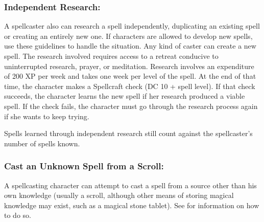 \subsubsection{Independent Research:} 
A spellcaster also can research a spell independently, duplicating an existing spell or creating an entirely new one. 
If characters are allowed to develop new spells, use these guidelines to handle the situation.
Any kind of caster can create a new spell. 
The research involved requires access to a retreat conducive to uninterrupted research, prayer, or meditation. 
Research involves an expenditure of 200 XP per week and takes one week per level of the spell. 
At the end of that time, the character makes a Spellcraft check (DC 10 + spell level). 
If that check succeeds, the character learns the new spell if her research produced a viable spell. 
If the check fails, the character must go through the research process again if she wants to keep trying.

Spells learned through independent research still count against the spellcaster's number of spells known.
\subsubsection{Cast an Unknown Spell from a Scroll:}
A spellcasting character can attempt to cast a spell from a source other than his own knowledge (usually a scroll, 
although other means of storing magical knowledge may exist, such as a magical stone tablet). 
See  for information on how to do so.


% 
